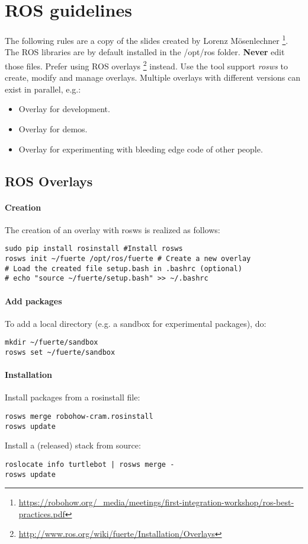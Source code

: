 \pagebreak
\section{ROS guidelines}

The following rules are a copy of the slides created by Lorenz M\"osenlechner \footnote{\url{https://robohow.org/_media/meetings/first-integration-workshop/ros-best-practices.pdf}}.\\

The ROS libraries are by default installed in the /opt/ros folder. 
\textbf{Never} edit those files. Prefer using ROS overlays \footnote{\url{http://www.ros.org/wiki/fuerte/Installation/Overlays}} instead.
Use the tool support \textit{rosws} to create, modify and manage overlays.
Multiple overlays with different versions can exist in parallel, e.g.:
\begin{itemize}
\item Overlay for development.
\item Overlay for demos.
\item Overlay for experimenting with bleeding edge code of other people.
\end{itemize}

\subsection{ROS Overlays}
\paragraph{Creation}
The creation of an overlay with rosws is realized as follows:
\begin{verbatim}
sudo pip install rosinstall #Install rosws
rosws init ~/fuerte /opt/ros/fuerte # Create a new overlay
# Load the created file setup.bash in .bashrc (optional)
# echo "source ~/fuerte/setup.bash" >> ~/.bashrc 
\end{verbatim}

\paragraph{Add packages}
To add a local directory (e.g. a sandbox for experimental packages), do:
\begin{verbatim}
mkdir ~/fuerte/sandbox
rosws set ~/fuerte/sandbox
\end{verbatim}

\paragraph{Installation}
Install packages from a rosinstall file:
\begin{verbatim}
rosws merge robohow-cram.rosinstall
rosws update
\end{verbatim}
Install a (released) stack from source:
\begin{verbatim}
roslocate info turtlebot | rosws merge -
rosws update
\end{verbatim}

